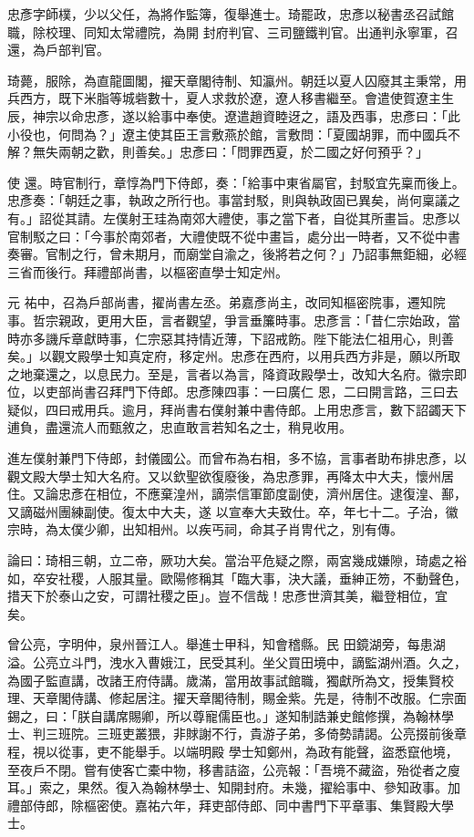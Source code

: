 \begin{pinyinscope}
 忠彥字師樸，少以父任，為將作監簿，復舉進士。琦罷政，忠彥以秘書丞召試館職，除校理、同知太常禮院，為開
 封府判官、三司鹽鐵判官。出通判永寧軍，召還，為戶部判官。



 琦薨，服除，為直龍圖閣，擢天章閣待制、知瀛州。朝廷以夏人囚廢其主秉常，用兵西方，既下米脂等城砦數十，夏人求救於遼，遼人移書繼至。會遣使賀遼主生辰，神宗以命忠彥，遂以給事中奉使。遼遣趙資睦迓之，語及西事，忠彥曰：「此小役也，何問為？」遼主使其臣王言敷燕於館，言敷問：「夏國胡罪，而中國兵不解？無失兩朝之歡，則善矣。」忠彥曰：「問罪西夏，於二國之好何預乎？」



 使
 還。時官制行，章惇為門下侍郎，奏：「給事中東省屬官，封駁宜先稟而後上。忠彥奏：「朝廷之事，執政之所行也。事當封駁，則與執政固已異矣，尚何稟議之有。」詔從其請。左僕射王珪為南郊大禮使，事之當下者，自從其所畫旨。忠彥以官制駁之曰：「今事於南郊者，大禮使既不從中畫旨，處分出一時者，又不從中書奏審。官制之行，曾未期月，而廟堂自渝之，後將若之何？」乃詔事無鉅細，必經三省而後行。拜禮部尚書，以樞密直學士知定州。



 元
 祐中，召為戶部尚書，擢尚書左丞。弟嘉彥尚主，改同知樞密院事，遷知院事。哲宗親政，更用大臣，言者觀望，爭言垂簾時事。忠彥言：「昔仁宗始政，當時亦多譏斥章獻時事，仁宗惡其持情近薄，下詔戒飭。陛下能法仁祖用心，則善矣。」以觀文殿學士知真定府，移定州。忠彥在西府，以用兵西方非是，願以所取之地棄還之，以息民力。至是，言者以為言，降資政殿學士，改知大名府。徽宗即位，以吏部尚書召拜門下侍郎。忠彥陳四事：一曰廣仁
 恩，二曰開言路，三曰去疑似，四曰戒用兵。逾月，拜尚書右僕射兼中書侍郎。上用忠彥言，數下詔蠲天下逋負，盡還流人而甄敘之，忠直敢言若知名之士，稍見收用。



 進左僕射兼門下侍郎，封儀國公。而曾布為右相，多不協，言事者助布排忠彥，以觀文殿大學士知大名府。又以欽聖欲復廢後，為忠彥罪，再降太中大夫，懷州居住。又論忠彥在相位，不應棄湟州，謫崇信軍節度副使，濟州居住。逮復湟、鄯，又謫磁州團練副使。復太中大夫，遂
 以宣奉大夫致仕。卒，年七十二。子治，徽宗時，為太僕少卿，出知相州。以疾丐祠，命其子肖冑代之，別有傳。



 論曰：琦相三朝，立二帝，厥功大矣。當治平危疑之際，兩宮幾成嫌隙，琦處之裕如，卒安社稷，人服其量。歐陽修稱其「臨大事，決大議，垂紳正笏，不動聲色，措天下於泰山之安，可謂社稷之臣」。豈不信哉！忠彥世濟其美，繼登相位，宜矣。



 曾公亮，字明仲，泉州晉江人。舉進士甲科，知會稽縣。民
 田鏡湖旁，每患湖溢。公亮立斗門，洩水入曹娥江，民受其利。坐父買田境中，謫監湖州酒。久之，為國子監直講，改諸王府侍講。歲滿，當用故事試館職，獨獻所為文，授集賢校理、天章閣侍講、修起居注。擢天章閣待制，賜金紫。先是，待制不改服。仁宗面錫之，曰：「朕自講席賜卿，所以尊寵儒臣也。」遂知制誥兼史館修撰，為翰林學士、判三班院。三班吏叢猥，非賕謝不行，貴游子弟，多倚勢請謁。公亮掇前後章程，視以從事，吏不能舉手。以端明殿
 學士知鄭州，為政有能聲，盜悉竄他境，至夜戶不閉。嘗有使客亡橐中物，移書詰盜，公亮報：「吾境不藏盜，殆從者之廋耳。」索之，果然。復入為翰林學士、知開封府。未幾，擢給事中、參知政事。加禮部侍郎，除樞密使。嘉祐六年，拜吏部侍郎、同中書門下平章事、集賢殿大學士。




\end{pinyinscope}

